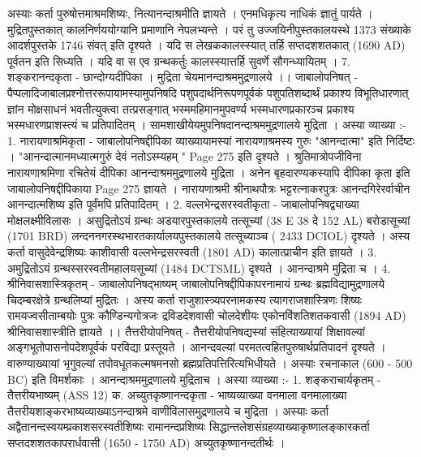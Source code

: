 अस्याः कर्ता पुरुषोत्तमाश्रमशिष्यः, नित्यानन्दाश्रमीति ज्ञायते । एनमधिकृत्य नाधिकं ज्ञातुं पार्यते । मुद्रितपुस्तकात् कालनिर्णययोग्यानि प्रमाणानि नेपलभ्यन्ते । परं तु उज्जयिनीपुस्तकालयस्थे 1373  संख्याके आदर्शपुस्तके 1746  संवत् इति दृश्यते । यदि स लेखककालस्स्यात् तर्हि सप्तदशशतकात् (1690 AD)  पूर्वतन इति सिध्यति । यदि वा स एव ग्रन्थकर्तुः कालस्स्यात्तर्हि सुवर्णे सौगन्ध्यायितम् । 
7.  शङ्करानन्दकृता - छान्दोग्यदीपिका । मुद्रिता चेयमानन्दाश्रममुद्रणालये ।। 
जाबालोपनिषत् - 
पैप्पलादिजाबालप्रश्नोत्तररूपायामस्यामुपनिषदि पशुपदार्थनिरूपणपूर्वकं पशुपतिशब्दार्थं प्रकाश्य विभूतिधारणात् ज्ञांन मोक्षसाधनं भवतीत्युक्त्वा तत्प्रसङ्गात् भस्ममहिमानमुपवर्ण्य भस्मधारणप्रकारञ्च प्रकाश्य भस्मधारणप्राशस्त्यं च प्रतिपादितम् । सामशाखीयेयमुपनिषदानन्दाश्रममुद्रणालये मुद्रिता । अस्या व्याख्या :- 
1. नारायणाश्रमिकृता - जाबालोपनिषद्दीपिका 
व्याख्यायामस्यां नारायणाश्रमस्य गुरुः "आनन्दात्मा" इति निर्दिष्टः । "आनन्दात्मानमध्यात्मगुरुं देवं नतोऽस्म्यहम् " Page 275 इति दृश्यते । 
श्रुतिमात्रोपजीविना नारायणाश्रमिणा रचितेयं दीपिका आनन्दाश्रममुद्रणालये मुद्रिता । अनेन बृहदारण्यकस्यापि दीपिका कृता इति जाबालोपनिषद्दीपिकाया Page 275  ज्ञायते । नारायणाश्रमी श्रीनाथपौत्रः भट्टरत्नाकरपुत्रः आनन्दगिरेरर्वाचीन आनन्दात्मशिष्य इति पूर्वंमपि प्रतिपादितम् । 
2. वल्लभेन्द्रसरस्वतीकृता - जाबालोपनिषद्व्याख्या मोक्षलक्ष्मीविलासः ।
असुद्रितोऽयं ग्रन्थः अडयारपुस्तकालये तत्सूच्यां (38 E 38 दे 152 AL) बरोडासूच्यां (1701 BRD) लन्दननगरस्थभारतकार्यालयपुस्तकालये तत्सूच्याञ्च ( 2433 DCIOL) दृश्यते । अस्य कर्ता वासुदेवेन्द्रशिष्यः काशीवासी वल्लभेन्द्रसरस्वती (1801 AD) कालात्प्राचीन इति ज्ञायते । 
3. अमुद्रितोऽयं ग्रन्थस्सरस्वतीमहालयसूच्यां (1484 DCTSML) दृश्यते । आनन्दाश्रमे मुद्रिता च ।  
4. श्रीनिवासशास्त्रिकृतम् - जाबालोपनिषद्भाष्यम्  
जाबालोपनिषद्दीपिकापरनामायं ग्रन्थः ब्रह्मविद्यामुद्रणालये चिदम्बरक्षेत्रे ग्रन्थलिप्यां मुद्रितः । अस्य कर्ता राजुशास्त्र्यपरनामकस्य त्यागराजशास्त्रिणः शिष्यः रामयज्वसीताम्बयोः पुत्रः कौण्डिन्यगोत्रजः द्रविडदेशवासी चोलदेशीयः एकोनविंशतिशतकवासी (1894 AD) श्रीनिवासशास्त्रीति ज्ञायते ।। 
तैत्तरीयोपनिषत् - 
तैत्तरीयोपनिषद्यस्यां संहित्याख्यायां शिक्षावल्यां अङ्गभूतोपासनोपदेशपूर्वकं परविद्या प्रस्तूयते । आनन्दवल्यां परमतत्वहितपुरुषार्थप्रतिपादनं दृश्यते । वारुण्याख्यायां भृगुवल्यां तपोवधूतकल्मषमनसो ब्रह्मप्रतिपत्तिरित्यभिधीयते । अस्याः रचनाकाल (600 - 500 BC) इति विमर्शकाः । आनन्दाश्रममुद्रणालये मुद्रिताच । अस्या व्याख्या :- 
1. शङ्कराचार्यकृतम् - तैत्तरीयभाष्यम् (ASS 12)
क. अच्युतकृष्णानन्दकृता - भाष्यव्याख्या वनमाला 
वनमालाख्या तैत्तरीयशाङ्करभाष्यव्याख्याऽनन्दाश्रमे वाणीविलासमुद्रणालये च मुद्रिता । अस्याः कर्ता अद्वैतानन्दस्वयम्प्रकाशसरस्वतीशिष्यः रामानन्दप्रशिष्यः सिद्धान्तलेशसंग्रहव्याख्याकृष्णालङ्कारकर्ता सप्तदशशतकापरार्धवासी (1650 - 1750 AD) अच्युतकृष्णानन्दतीर्थः ।
